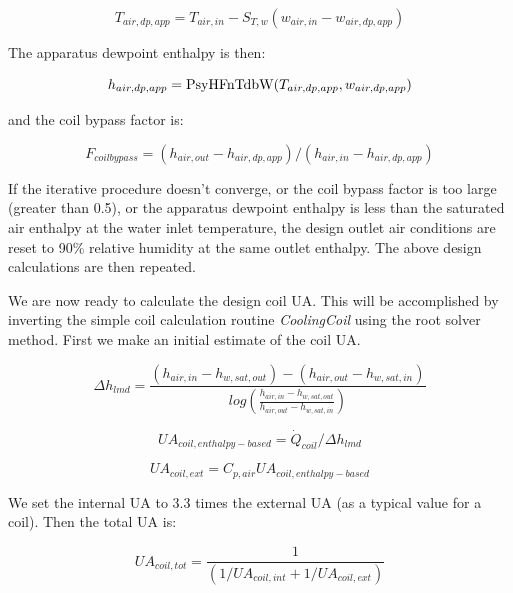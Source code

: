 \begin{equation}
{T_{air,dp,app}} = {T_{air,in}} - {S_{T,w}}({w_{air,in}} - {w_{air,dp,app}})
\end{equation}

The apparatus dewpoint enthalpy is then:

\begin{equation}
{h_{air,dp,app}} = {\rm{PsyHFnTdbW}}({T_{air,dp,app}},{w_{air,dp,app}})
\end{equation}

and the coil bypass factor is:

\begin{equation}
{F_{coilbypass}} = ({h_{air,out}} - {h_{air,dp,app}})/({h_{air,in}} - {h_{air,dp,app}})
\end{equation}

If the iterative procedure doesn't converge, or the coil bypass factor is too large (greater than 0.5), or the apparatus dewpoint enthalpy is less than the saturated air enthalpy at the water inlet temperature, the design outlet air conditions are reset to 90\% relative humidity at the same outlet enthalpy. The above design calculations are then repeated.

We are now ready to calculate the design coil UA. This will be accomplished by inverting the simple coil calculation routine \emph{CoolingCoil} using the root solver method. First we make an initial estimate of the coil UA.

\begin{equation}
    \Delta {h_{lmd}} = \frac{({h_{air,in}} - {h_{w,sat,out}}) - ({h_{air,out}} - {h_{w,sat,in}})}{log(\frac{{h_{air,in}} - {h_{w,sat,out}}}{{h_{air,out}} - {h_{w,sat,in}}})}
\end{equation}

\begin{equation}
U{A_{coil,enthalpy - based}} = {\dot Q_{coil}}/\Delta {h_{lmd}}
\end{equation}

\begin{equation}
U{A_{coil,ext}} = {C_{p,air}}U{A_{coil,enthalpy - based}}
\end{equation}

We set the internal UA to 3.3 times the external UA (as a typical value for a coil). Then the total UA is:

\begin{equation}
  UA_{coil,tot} = \frac{1}{{(1/U{A_{coil,int}} + 1/U{A_{coil,ext}})}}
\end{equation}

